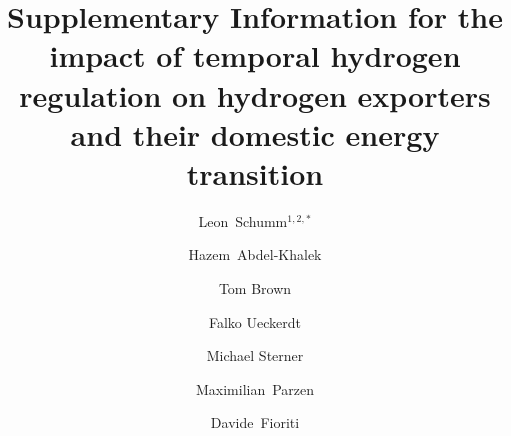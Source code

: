 \documentclass[5p,numafflabel]{elsarticle}
\begin{document}
\begin{frontmatter}

	\title{Supplementary Information for the impact of temporal hydrogen regulation on hydrogen exporters and their domestic energy transition}

    
    \author{Leon~Schumm${}^{1,2,*}$}
	\author[ieg,alu,oet]{Hazem~Abdel-Khalek}
	\author[tub]{Tom Brown}
	\author[pik]{Falko Ueckerdt}
	\author[oth]{Michael Sterner}
	\author[oet,uoe]{Maximilian~Parzen}
	\author[unipi]{Davide~Fioriti}

	\address[oth]{Research Center on Energy Transmission and Storage (FENES), Faculty of Electrical and Information Technology, University of Applied Sciences (OTH) Regensburg, Seybothstr. 2, 93053 Regensburg, Germany}
	\address[tub]{Department of Digital Transformation in Energy Systems, Technische Universität Berlin, Einsteinufer 25 (TA 8), 10587 Berlin, Germany}
	\address[ieg]{Fraunhofer Research Institution for Energy Infrastructures and Geothermal Systems IEG, Gulbener Straße 23, 03046 Cottbus, Germany}
	\address[alu]{Albert-Ludwigs Universität Freiburg, Faculty of Environment and Natural Resources, Tennenbacher Str. 4, 79106 Freiburg im Breisgau, Germany}
	\address[oet]{Open Energy Transition, Königsallee 52, 95448 Bayreuth, Germany}
	\address[pik]{Potsdam Institute for Climate Impact Research, Telegrafenberg, 14473 Potsdam, Germany}
	\address[uoe]{University of Edinburgh, Institute for Energy Systems, EH9 3DW Edinburgh, United Kingdom}
	\address[unipi]{University of Pisa, Department of Energy Systems, Territory and Construction Engineering, Largo Lucio Lazzarino, 56122 Pisa, Italy}

	\address{${}^{*}$ Corresponding author. Email: leon1.schumm@oth-regensburg.de}

\end{frontmatter}




\newpage
\onecolumn

\makeatletter
\renewcommand \thesection{S\@arabic\c@section}
\renewcommand\thetable{S\@arabic\c@table}
\renewcommand \thefigure{\@arabic\c@figure}
\renewcommand{\figurename}{Supplementary Fig.}
\makeatother
\setcounter{equation}{0}
\setcounter{figure}{0}
\setcounter{table}{0}
\setcounter{section}{0}


\renewcommand{\contentsname}{Supplementary Items List}
\setcounter{tocdepth}{2}
\tableofcontents
\newpage


\label{sec:si}
\end{document}
